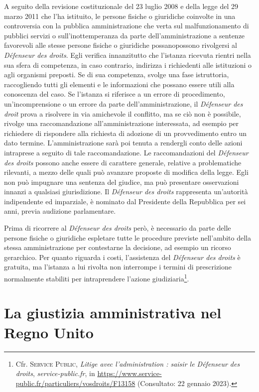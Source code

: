 \documentclass[12pt,it,a4paper,]{report}
\begin{document}
A seguito della revisione costituzionale del 23 luglio 2008 e della
legge del 29 marzo 2011 che l'ha istituito, le persone fisiche o
giuridiche coinvolte in una controversia con la pubblica amministrazione
che verta sul malfunzionamento di pubblici servizi o sull'inottemperanza
da parte dell'amministrazione a sentenze favorevoli alle stesse persone
fisiche o giuridiche possanopossono rivolgersi al \emph{Défenseur des
droits}. Egli verifica innanzitutto che l'istanza ricevuta rientri nella
sua sfera di competenza, in caso contrario, indirizza i richiedenti alle
istituzioni o agli organismi preposti. Se di sua competenza, svolge una
fase istruttoria, raccogliendo tutti gli elementi e le informazioni che
possano essere utili alla conoscenza del caso. Se l'istanza si riferisce
a un errore di procedimento, un'incomprensione o un errore da parte
dell'amministrazione, il \emph{Défenseur des droit} prova a risolvere in
via amichevole il conflitto, ma se ciò non è possibile, rivolge una
raccomandazione all'amministrazione interessata, ad esempio per
richiedere di rispondere alla richiesta di adozione di un provvedimento
entro un dato termine. L'amministrazione sarà poi tenuta a rendergli
conto delle azioni intraprese a seguito di tale raccomandazione. Le
raccomandazioni del \emph{Défenseur des droits} possono anche essere di
carattere generale, relative a problematiche rilevanti, a mezzo delle
quali può avanzare proposte di modifica della legge. Egli non può
impugnare una sentenza del giudice, ma può presentare osservazioni
innanzi a qualsiasi giurisdizione. Il \emph{Défenseur des droits}
rappresenta un'autorità indipendente ed imparziale, è nominato dal
Presidente della Repubblica per sei anni, previa audizione parlamentare.

Prima di ricorrere al \emph{Défenseur des droits} però, è necessario da
parte delle persone fisiche o giuridiche espletare tutte le procedure
previste nell'ambito della stessa amministrazione per contestarne la
decisione, ad esempio un ricorso gerarchico. Per quanto riguarda i
costi, l'assistenza del \emph{Défenseur des droits} è gratuita, ma
l'istanza a lui rivolta non interrompe i termini di prescrizione
normalmente stabiliti per intraprendere l'azione giudiziaria\footnote{Cfr.
  \textsc{Service Public}, \emph{Litige avec l'administration : saisir
  le Défenseur des droits}, \emph{service-public.fr}, in
  \url{https://www.service-public.fr/particuliers/vosdroits/F13158}
  (Consultato: 22 gennaio 2023).}.

\hypertarget{la-giustizia-amministrativa-nel-regno-unito}{%
\chapter{La giustizia amministrativa nel Regno
Unito}\label{la-giustizia-amministrativa-nel-regno-unito}}
\end{document}
